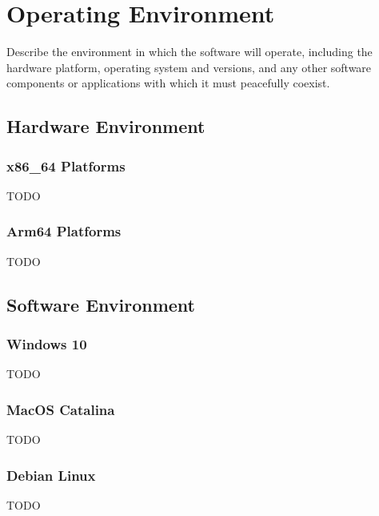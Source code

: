 \section{Operating Environment} \label{sec:operating_environment}

Describe the environment in which the software will operate, including the 
hardware platform, operating system and versions, and any other software 
components or applications with which it must peacefully coexist.

\subsection{Hardware Environment}
\subsubsection{x86_64 Platforms}
TODO

\subsubsection{Arm64 Platforms}
TODO

\subsection{Software Environment}
\subsubsection{Windows 10}
TODO

\subsubsection{MacOS Catalina}
TODO

\subsubsection{Debian Linux}
TODO

